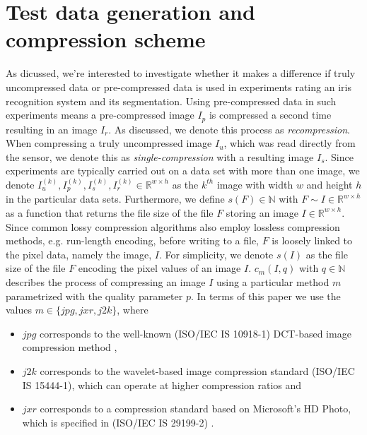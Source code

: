 \documentclass[10pt,twocolumn,letterpaper]{article}
\begin{document}
\section{Test data generation and compression scheme}
\label{section:comprScheme}
As dicussed, we're interested to investigate whether it makes a difference if truly uncompressed data or pre-compressed data is used in experiments rating an iris recognition system and its segmentation. 
Using pre-compressed data in such experiments means a pre-compressed image $I_p$ is compressed a second time resulting in an image $I_r$. As discussed, we denote this process as \emph{recompression}. When compressing a truly uncompressed image $I_u$, which was read directly from the sensor, we denote this as \emph{single-compression} with a resulting image $I_s$. Since experiments are typically carried out on a data set with more than one image, we denote $I_u^{(k)}, I_p^{(k)}, I_s^{(k)}, I_r^{(k)} \in \mathbb{R}^{w \times h}$ as the $k^{th}$ image with width $w$ and height $h$ in the particular data sets. Furthermore, we define $s(F) \in \mathbb{N}$ with $F \sim{I \in \mathbb{R}^{w \times h}}$ as a function that returns the file size of the file $F$ storing an image $I \in \mathbb{R}^{w \times h} $. Since common lossy compression algorithms also employ lossless compression methods, e.g. run-length encoding, before writing to a file, $F$ is loosely linked to the pixel data, namely the image, $I$. For simplicity, we denote $s(I)$ as the file size of the file $F$ encoding the pixel values of an image $I$. $c_{m}(I, q)$ with $q \in \mathbb{N}$ describes the process of compressing an image $I$ using a particular method $m$ parametrized with the quality parameter $p$. In terms of this paper we use the values $m \in \{jpg, jxr, j2k\}$, where 
\begin{itemize}
	\item $jpg$ corresponds to the well-known (ISO/IEC IS 10918-1) DCT-based image compression method \cite{jpg},
	\item $j2k$ corresponds to the wavelet-based image compression standard (ISO/IEC IS 15444-1), which can operate at higher compression ratios \cite{j2k} and
	\item $jxr$ corresponds to a compression standard based on Microsoft’s HD Photo, which is specified in (ISO/IEC IS 29199-2) \cite{jxr}.  
\end{itemize}

\end{document}
